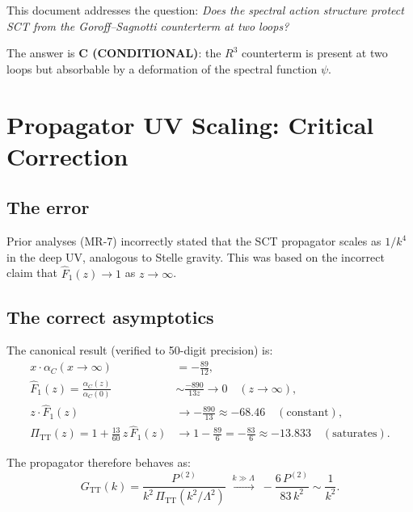 \documentclass[12pt,a4paper]{article}
\begin{document}
This document addresses the question: \emph{Does the spectral action
structure protect SCT from the Goroff--Sagnotti counterterm at two loops?}

The answer is \textbf{C (CONDITIONAL)}: the $R^3$ counterterm is present
at two loops but absorbable by a deformation of the spectral function $\psi$.

\section{Propagator UV Scaling: Critical Correction}
\label{sec:propagator}

\subsection{The error}

Prior analyses (MR-7) incorrectly stated that the SCT propagator
scales as $1/k^4$ in the deep UV, analogous to Stelle gravity. This
was based on the incorrect claim that $\hat{F}_1(z) \to 1$ as
$z \to \infty$.

\subsection{The correct asymptotics}

The canonical result (verified to 50-digit precision) is:
\begin{align}
  x \cdot \alpha_C(x \to \infty) &= -\frac{89}{12}, \label{eq:uv_asym} \\
  \hat{F}_1(z) = \frac{\alpha_C(z)}{\alpha_C(0)} &\sim \frac{-890}{13z}
  \to 0 \quad (z \to \infty), \label{eq:Fhat1_uv} \\
  z \cdot \hat{F}_1(z) &\to -\frac{890}{13} \approx -68.46
  \quad (\text{constant}), \label{eq:zFhat1} \\
  \Pi_{\mathrm{TT}}(z) = 1 + \frac{13}{60}\,z\,\hat{F}_1(z)
  &\to 1 - \frac{89}{6} = -\frac{83}{6} \approx -13.833
  \quad (\text{saturates}). \label{eq:Pi_sat}
\end{align}

\noindent The propagator therefore behaves as:
\begin{equation}
  G_{\mathrm{TT}}(k) = \frac{P^{(2)}}{k^2\,\Pi_{\mathrm{TT}}(k^2/\Lambda^2)}
  \;\xrightarrow{k \gg \Lambda}\;
  -\frac{6\,P^{(2)}}{83\,k^2} \sim \frac{1}{k^2}.
  \label{eq:G_uv}
\end{equation}
\end{document}
